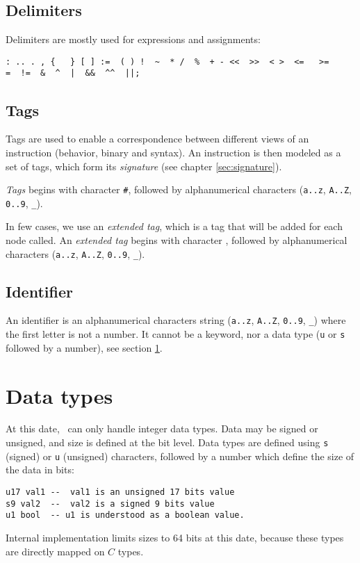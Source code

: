 \subsection{Delimiters}
Delimiters are mostly used for expressions and assignments:
\begin{lstlisting}
: .. . , {   } [ ] :=  ( ) !  ~  * /  %  + - <<  >>  < >  <=   >=  
=  !=  &  ^  |  &&  ^^  ||;
\end{lstlisting}

\subsection{Tags}
\label{sec:etiquettes}
Tags are used to enable a correspondence between different views of an instruction (behavior, binary and syntax). An instruction is then modeled as a set of tags, which form its \emph{signature} (see chapter \ref{sec:signature}).

\emph{Tags} begins with character \texttt{\#}, followed by alphanumerical characters (\texttt{a..z}, \texttt{A..Z}, \texttt{0..9}, \texttt{\_}).

In few cases, we use an \emph{extended tag}, which is a tag that will be added for each node called. An \emph{extended tag} begins with character \texttt{\@}, followed by alphanumerical characters (\texttt{a..z}, \texttt{A..Z}, \texttt{0..9}, \texttt{\_}).

\subsection{Identifier}
\label{sec:identifiant}
An identifier is an alphanumerical characters string (\texttt{a..z}, \texttt{A..Z}, \texttt{0..9}, \texttt{\_}) where the first letter is not a number. It cannot be a keyword, nor a data type (\texttt{u} or \texttt{s} followed by a number), see section \ref{sec:TypeDonnees}.

\section{Data types}
\label{sec:TypeDonnees}
At this date, \harmless\ can only handle integer data types. Data may be signed or unsigned, and size is defined at the bit level. Data types are defined using  \texttt{s} (signed) or \texttt{u} (unsigned) characters, followed by a number which define the size of the data in bits:
\begin{lstlisting}
u17 val1 --  val1 is an unsigned 17 bits value
s9 val2  --  val2 is a signed 9 bits value
u1 bool  -- u1 is understood as a boolean value.
\end{lstlisting}
Internal implementation limits sizes to 64 bits at this date, because these types are directly mapped on $C$ types.

